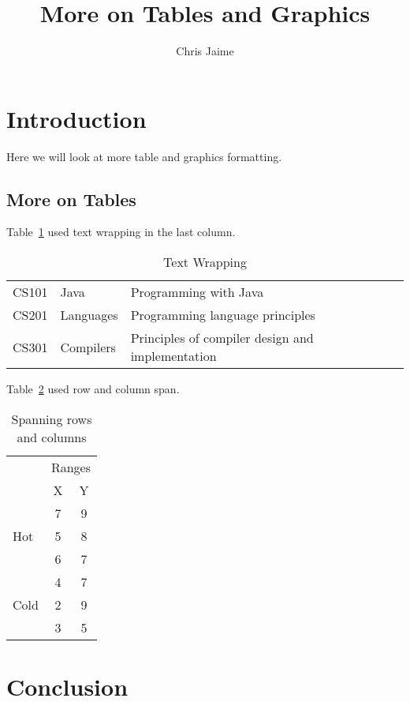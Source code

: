 \documentclass{proc}
\title{More on Tables and Graphics}
\author{Chris Jaime}
\date{}
\begin{document}
\maketitle

\section{Introduction}
Here we will look at more table and graphics formatting.

\subsection{More on Tables}
Table~\ref{tab:wrapping} used text wrapping in the last column.

\begin{table}[htbp]
\caption{Text Wrapping}
\begin{center}
\begin{tabular}{| l | l | p{3 cm} |} %
\hline
CS101 & Java & Programming with Java \\
CS201 & Languages & Programming language principles \\
CS301 & Compilers & Principles of compiler design and implementation \\
\hline
\end{tabular}
\end{center}
\label{tab:wrapping}
\end{table}

Table~\ref{tab:multi} used row and column span.

\begin{table}[htbp]
\caption{Spanning rows and columns}
\begin{center}
\begin{tabular}{| l | c | c |}
\hline
& \multicolumn{2}{c|}{Ranges} \\ %
& X & Y \\
\hline
\multirow{3}{*}{Hot} & 7 & 9 \\  %
& 5 & 8 \\
& 6 & 7 \\
\hline
\multirow{3}{*}{Cold} & 4 & 7 \\
& 2 & 9 \\
& 3 & 5 \\
\hline
\end{tabular}
\end{center}
\label{tab:multi}
\end{table}

\subsection{}

\section{Conclusion}
\end{document}
